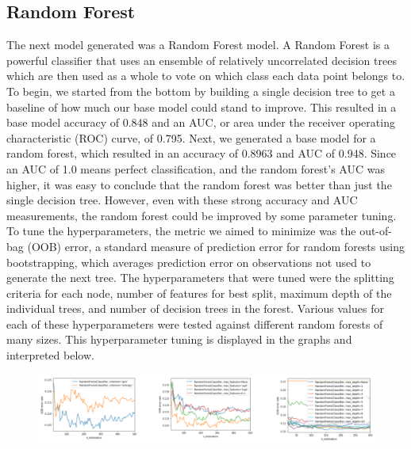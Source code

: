 \documentclass{article}
\begin{document}
\subsection{Random Forest}
\vspace*{-2mm}
The next model generated was a Random Forest model. A Random Forest is a powerful classifier that uses an ensemble of relatively uncorrelated decision trees which are then used as a whole to vote on which class each data point belongs to. To begin, we started from the bottom by building a single decision tree to get a baseline of how much our base model could stand to improve. This resulted in a base model accuracy of 0.848 and an AUC, or area under the receiver operating characteristic (ROC) curve, of 0.795. Next, we generated a base model for a random forest, which resulted in an accuracy of 0.8963 and AUC of 0.948. Since an AUC of 1.0 means perfect classification, and the random forest’s AUC was higher, it was easy to conclude that the random forest was better than just the single decision tree. However, even with these strong accuracy and AUC measurements, the random forest could be improved by some parameter tuning. To tune the hyperparameters, the metric we aimed to minimize was the out-of-bag (OOB) error, a standard measure of prediction error for random forests using bootstrapping, which averages prediction error on observations not used to generate the next tree. The hyperparameters that were tuned were the splitting criteria for each node, number of features for best split, maximum depth of the individual trees, and number of decision trees in the forest. Various values for each of these hyperparameters were tested against different random forests of many sizes. This hyperparameter tuning is displayed in the graphs and interpreted below.

\begin{figure}[htp]
    \centering
    \includegraphics[width=12cm]{RF_hyperparameter_tuning.png}
    \label{fig:randforest}
\end{figure}
\vspace*{-4mm}
\end{document}
